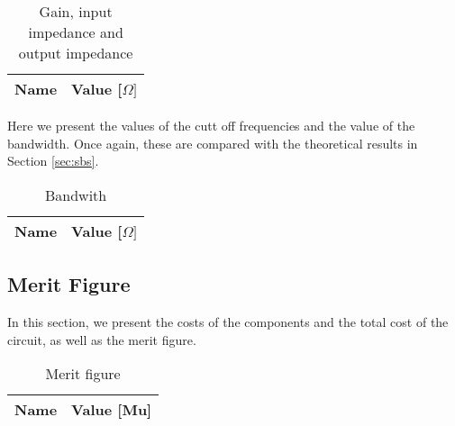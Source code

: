 \begin{table}[h]
  \centering
  \begin{tabular}{|l|r|}
    \hline    
    {\bf Name} & {\bf Value [$\Omega]$} \\ \hline
    
  \end{tabular}
  \caption{Gain, input impedance and output impedance}
  \label{tab:IN_out_sim}
\end{table}

Here we present the values of the cutt off frequencies and the value of the bandwidth. Once again, these are compared with the theoretical results in Section \ref{sec:sbs}.


\begin{table}[h]
  \centering
  \begin{tabular}{|l|r|}
    \hline    
    {\bf Name} & {\bf Value [$\Omega]$} \\ \hline
    
  \end{tabular}
  \caption{Bandwith}
  \label{tab:Bandwith_sim}
\end{table}
\pagebreak

\subsection{Merit Figure}
In this section, we present the costs of the components and the total cost of the circuit, as well as the merit figure.

\begin{table}[h]
  \centering
  \begin{tabular}{|l|r|}
    \hline    
    {\bf Name} & {\bf Value [Mu]} \\ \hline
    
  \end{tabular}
  \caption{Merit figure}
  \label{tab:OP}
\end{table}
\FloatBarrier

